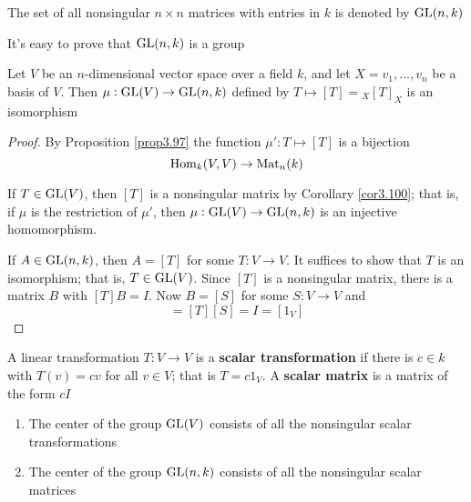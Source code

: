 \documentclass[11pt]{article}
\begin{document}
\begin{definition}[]
The set of all nonsingular \(n\times n\) matrices with entries in \(k\) is
denoted by \(\text{GL}(n,k)\)
\end{definition}

It's easy to prove that \(\text{GL}(n,k)\) is a group

\begin{proposition}[]
Let \(V\) be an \(n\)-dimensional vector space over a field \(k\), and let
\(X=v_1,\dots,v_n\) be a basis of \(V\). Then \(\mu:\text{GL}(V)\to\text{GL}(n,k)\) defined
by \(T\mapsto[T]={}_X[T]_X\) is an isomorphism
\end{proposition}

\begin{proof}
By Proposition \ref{prop3.97} the function \(\mu':T\mapsto[T]\) is a bijection
\begin{equation*}
\operatorname{Hom}_k(V,V)\to\operatorname{Mat}_n(k)
\end{equation*}

If \(T\in\text{GL}(V)\), then \([T]\) is a nonsingular matrix by Corollary
\ref{cor3.100}; that is, if \(\mu\) is the restriction of \(\mu'\), then 
\(\mu:\text{GL}(V)\to\text{GL}(n,k)\) is an injective homomorphism.

If \(A\in\text{GL}(n,k)\), then \(A=[T]\) for some \(T:V\to V\). It suffices to
show that \(T\) is an isomorphism; that is, \(T\in\text{GL}(V)\). Since \([T]\) is
a nonsingular matrix, there is a matrix \(B\) with \([T]B=I\). Now \(B=[S]\)
for some \(S:V\to V\) and 
\begin{equation*}
[TS]=[T][S]=I=[1_V]
\end{equation*}
\end{proof}

\begin{definition}[]
A linear transformation \(T:V\to V\) is a \textbf{scalar transformation} if there is 
\(c\in k\) with \(T(v)=cv\) for all \(v\in V\); that is \(T=c1_V\). A
\textbf{scalar matrix} is a matrix of the form \(cI\)
\end{definition}

\begin{corollary}[]
\begin{enumerate}
\item The center of the group \(\text{GL}(V)\) consists of all the nonsingular scalar
transformations
\item The center of the group \(\text{GL}(n,k)\) consists of all the nonsingular
scalar matrices
\end{enumerate}
\end{corollary}
\end{document}
